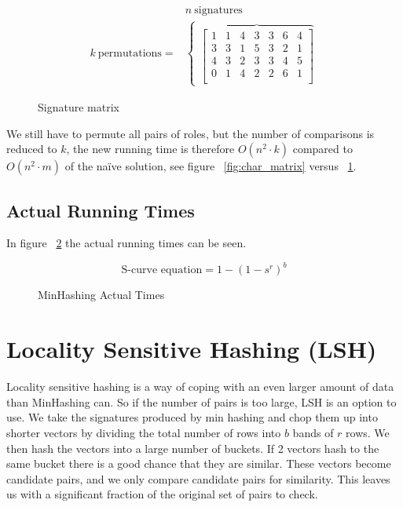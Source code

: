 \documentclass[a4paper,11pt]{article}
\begin{document}
\begin{figure}[!htpb]
    \begin{eqnarray*}
     & n \ \text{signatures} \\
     k \ \text{permutations} = & 
        \begin{cases}
        \overbrace{
        \begin{bmatrix}
            1 & 1 & 4 & 3 & 3 & 6 & 4\\
            3 & 3 & 1 & 5 & 3 & 2 & 1\\
            4 & 3 & 2 & 3 & 3 & 4 & 5\\
            0 & 1 & 4 & 2 & 2 & 6 & 1\\
        \end{bmatrix} 
        } 
        \end{cases}
    \end{eqnarray*}
    \caption{Signature matrix}
    \label{fig:signature_matrix}
\end{figure}

We still have to permute all pairs of roles, but the number of comparisons is reduced to $k$, the new running time is therefore $O(n^2 \cdot k)$ compared to $O(n^2 \cdot m)$ of the naïve solution, see figure ~\ref{fig:char_matrix} versus ~\ref{fig:signature_matrix}.

\subsection{Actual Running Times}
In figure ~\ref{fig:minhashing_at} the actual running times can be seen.


\begin{figure}[!htpb]
    \begin{center}
        
        \caption{MinHashing Actual Times}
        \label{fig:minhashing_at}
    \end{center}
\begin{equation}
    \text {S-curve equation} = 1 - (1 - s^r)^b 
\end{equation}
\end{figure}


\section{Locality Sensitive Hashing (LSH)}
Locality sensitive hashing is a way of coping with an even larger amount of data than MinHashing can. So if the number of pairs is too large, LSH is an option to use. We take the signatures produced by min hashing and chop them up into shorter vectors by dividing the total number of rows into $b$ bands of $r$ rows. We then hash the vectors into a large number of buckets. If 2 vectors hash to the same bucket there is a good chance that they are similar. These vectors become candidate pairs, and we only compare candidate pairs for similarity. This leaves us with a significant fraction of the original set of pairs to check. \\
\end{document}
